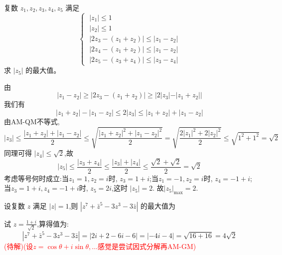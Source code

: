 \begin{questions}
    \question 复数 $z_1,z_2,z_3,z_4,z_5$ 满足
    \begin{equation*}
    \begin{cases}
    \;|z_1| \leq 1 \\
    \;|z_2| \leq 1 \\
    \;|2z_3 - (z_1 + z_2)| \leq |z_1 - z_2| \\
    \;|2z_4 - (z_1 + z_2)| \leq |z_1 - z_2| \\
    \;|2z_5 - (z_3 + z_4)| \leq |z_3 - z_4|
    \end{cases}
    \end{equation*}
    求 $|z_5|$ 的最大值。
    \begin{solution}
        由\[
        |z_1 - z_2| \geq |2z_3 - (z_1 + z_2)| \geq |2|z_3| - |z_1 + z_2||
        \] 
        我们有
        \[
        |z_1 + z_2| - |z_1 - z_2| \leq 2|z_3| \leq |z_1 + z_2| + |z_1 - z_2|
        \] 
        由AM-QM不等式,
        \[
        |z_3| \leq \frac{|z_1 + z_2| + |z_1 - z_2|}{2} \leq \sqrt{\frac{|z_1 + z_2|^2 + |z_1 - z_2|^2}{2}} = \sqrt{\frac{2|z_1|^2 + 2|z_2|^2}{2}} \leq \sqrt{1^2 + 1^2} = \sqrt{2}
        \] 
        同理可得 $|z_4| \leq \sqrt{2}$,故
        $$ |z_5| \leq \frac{|z_3 + z_4|}{2} \leq \frac{|z_3| + |z_4|}{2} \leq \frac{\sqrt{2} + \sqrt{2}}{2} = \sqrt{2}$$ 
        考虑等号何时成立:当$z_1=1, z_2=i$时, \(z_{3}=1+i\);当$z_1=-1,z_2=i$时, \(z_{4}=-1+i\); 当$z_3=1+i, z_4=-1+i$时, \(z_{5}=2i\),这时 \(|z_{5}|=2\). 故$|z_5|_{\max}=2$.
    \end{solution}
    
    \question 设复数 $z$ 满足 $|z|=1$,则 $|z^7 + \bar{z}^5 - 3z^3 - 3\bar{z}|$ 的最大值为
    \begin{solution}
        试 $z = \frac{1+i}{\sqrt{2}}$,算得值为:
        \[
        |z^7 + \bar{z}^5 - 3z^3 - 3\bar{z}| = |2i + 2 - 6i - 6| = |-4i - 4| = \sqrt{16 + 16} = \boxed{4\sqrt{2}}
        \]
        \textcolor{red}{(待解)(设$z=\cos \theta + i \sin \theta,...$感觉是尝试因式分解再AM-GM)}

    \end{solution}

    \question 
\end{questions}
